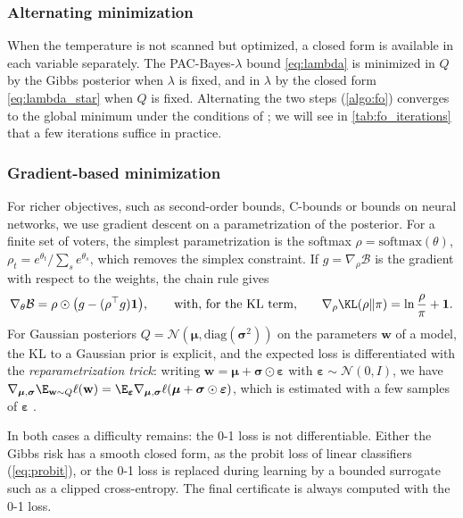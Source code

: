 \subsubsection{Alternating minimization}

When the temperature is not scanned but optimized, a closed form is available
in each variable separately. The PAC-Bayes-$\lambda$ bound \eqref{eq:lambda} is minimized in $Q$ by the Gibbs
posterior when $\lambda$ is fixed, and in $\lambda$ by the closed form
\eqref{eq:lambda_star} when $Q$ is fixed. Alternating the two steps
(\cref{algo:fo}) converges to the global minimum under the conditions of
\citet{thiemann2017strongly}; we will see in \cref{tab:fo_iterations} that a few
iterations suffice in practice.

\subsubsection{Gradient-based minimization}

For richer objectives, such as second-order bounds, C-bounds or bounds on
neural networks, we use gradient descent on a parametrization of the posterior.
For a finite set of voters, the simplest parametrization is the softmax
$\rho=\mathrm{softmax}(\theta)$, $\rho_t=e^{\theta_t}/\sum_se^{\theta_s}$, which
removes the simplex constraint. If $g=\nabla_\rho\mathcal B$ is the gradient
with respect to the weights, the chain rule gives
\begin{equation}\label{eq:softmax_grad}
\nabla_\theta\mathcal B=\rho\odot\big(g-(\rho^\top g)\mathbf 1\big),
\qquad\text{with, for the KL term,}\qquad
\nabla_\rho\KL(\rho\|\pi)=\ln\frac{\rho}{\pi}+\mathbf 1 .
\end{equation}
For Gaussian posteriors $Q=\mathcal N(\boldsymbol\mu,\mathrm{diag}(\boldsymbol\sigma^2))$ on the
parameters $\mathbf w$ of a model, the KL to a Gaussian prior is explicit, and
the expected loss is differentiated with the \emph{reparametrization trick}:
writing $\mathbf w=\boldsymbol\mu+\boldsymbol\sigma\odot\boldsymbol\varepsilon$ with
$\boldsymbol\varepsilon\sim\mathcal N(0,I)$, we have
$\nabla_{\boldsymbol\mu,\boldsymbol\sigma}\E_{\mathbf w\sim Q}\ell(\mathbf w)=\E_{\boldsymbol\varepsilon}\nabla_{\boldsymbol\mu,\boldsymbol\sigma}\ell(\boldsymbol\mu+\boldsymbol\sigma\odot\boldsymbol\varepsilon)$,
which is estimated with a few samples of $\boldsymbol\varepsilon$
\citep{dziugaite2017computing,perez2021tighter}.

In both cases a difficulty remains: the 0-1 loss is not differentiable. Either the Gibbs risk has a smooth
closed form, as the probit loss of linear classifiers (\cref{eq:probit}), or the
0-1 loss is replaced during learning by a bounded surrogate such as a clipped
cross-entropy. The final certificate is always computed with the 0-1 loss.

